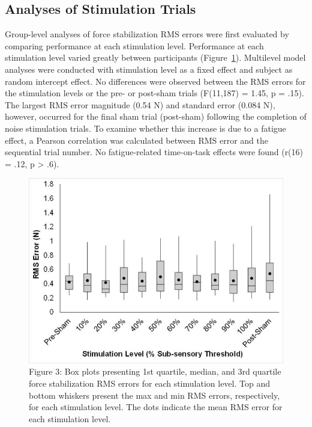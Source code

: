 \documentclass[]{cik}%
\begin{document}
\hypertarget{analyses-of-stimulation-trials}{%
\subsection{Analyses of Stimulation
Trials}\label{analyses-of-stimulation-trials}}

Group-level analyses of force stabilization RMS errors were first
evaluated by comparing performance at each stimulation level.
Performance at each stimulation level varied greatly between
participants (Figure~\ref{fig-3}). Multilevel model analyses were
conducted with stimulation level as a fixed effect and subject as random
intercept effect. No differences were observed between the RMS errors
for the stimulation levels or the pre- or post-sham trials (F(11,187) =
1.45, p = .15). The largest RMS error magnitude (0.54 N) and standard
error (0.084 N), however, occurred for the final sham trial (post-sham)
following the completion of noise stimulation trials. To examine whether
this increase is due to a fatigue effect, a Pearson correlation was
calculated between RMS error and the sequential trial number. No
fatigue-related time-on-task effects were found (r(16) = .12, p
\textgreater{} .6).

\begin{figure}

{\centering \includegraphics[width=1\textwidth,height=\textheight]{./figures/fig3.pdf}

}

\caption{\label{fig-3}Figure 3: Box plots presenting 1st quartile,
median, and 3rd quartile force stabilization RMS errors for each
stimulation level. Top and bottom whiskers present the max and min RMS
errors, respectively, for each stimulation level. The dots indicate the
mean RMS error for each stimulation level.}

\end{figure}
\end{document}
